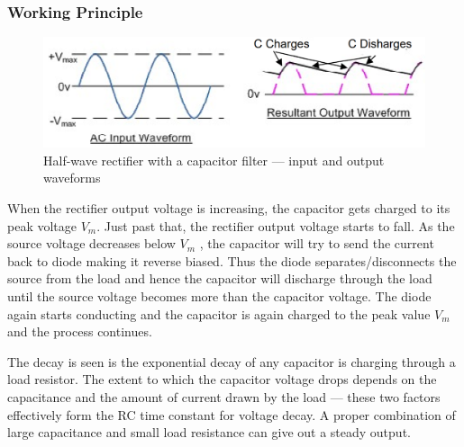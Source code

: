 \subsubsection{Working Principle}

\begin{figure}[H]
    \centering
    \includegraphics[width=1\columnwidth]{images/f2.png}
    \caption{Half-wave rectifier with a capacitor filter --- input and output waveforms}
\end{figure}

When the rectifier output voltage is increasing, the capacitor gets charged to its peak voltage $V_m$. Just past that, the rectifier output voltage starts to fall. As the source voltage decreases below $V_m$ , the capacitor will try to send the current back to diode making it reverse biased. Thus the diode separates/disconnects the source from the load and hence the capacitor will discharge through the load until the source voltage becomes more than the capacitor voltage. The diode again starts conducting and the capacitor is again charged to the peak value $V_m$ and the process continues. 

The decay is seen is the exponential decay of any capacitor is charging through a load resistor. The extent to which the capacitor voltage drops depends on the capacitance and the amount of current drawn by the load --- these two factors effectively form the RC time constant for voltage decay. A proper combination of large capacitance and small load resistance can give out a steady output.